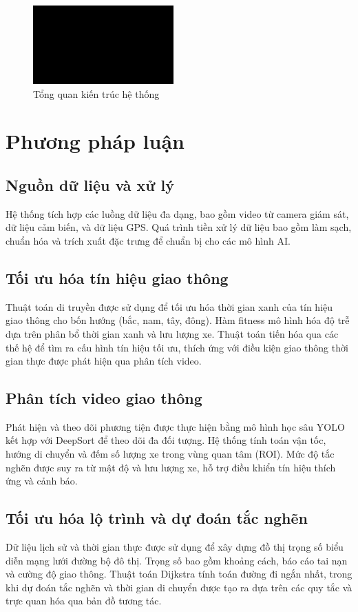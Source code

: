 \documentclass[conference]{IEEEtran}
\begin{document}
\begin{figure}[H]
    \centering
    \includegraphics[width=0.48\textwidth]{imgs/images.png}
    \caption{Tổng quan kiến trúc hệ thống}
    \label{fig:architecture_vn}
\end{figure}

\section{Phương pháp luận}
\subsection{Nguồn dữ liệu và xử lý}
Hệ thống tích hợp các luồng dữ liệu đa dạng, bao gồm video từ camera giám sát, dữ liệu cảm biến, và dữ liệu GPS. Quá trình tiền xử lý dữ liệu bao gồm làm sạch, chuẩn hóa và trích xuất đặc trưng để chuẩn bị cho các mô hình AI.

\subsection{Tối ưu hóa tín hiệu giao thông}
Thuật toán di truyền được sử dụng để tối ưu hóa thời gian xanh của tín hiệu giao thông cho bốn hướng (bắc, nam, tây, đông). Hàm fitness mô hình hóa độ trễ dựa trên phân bổ thời gian xanh và lưu lượng xe. Thuật toán tiến hóa qua các thế hệ để tìm ra cấu hình tín hiệu tối ưu, thích ứng với điều kiện giao thông thời gian thực được phát hiện qua phân tích video.

\subsection{Phân tích video giao thông}
Phát hiện và theo dõi phương tiện được thực hiện bằng mô hình học sâu YOLO kết hợp với DeepSort để theo dõi đa đối tượng. Hệ thống tính toán vận tốc, hướng di chuyển và đếm số lượng xe trong vùng quan tâm (ROI). Mức độ tắc nghẽn được suy ra từ mật độ và lưu lượng xe, hỗ trợ điều khiển tín hiệu thích ứng và cảnh báo.

\subsection{Tối ưu hóa lộ trình và dự đoán tắc nghẽn}
Dữ liệu lịch sử và thời gian thực được sử dụng để xây dựng đồ thị trọng số biểu diễn mạng lưới đường bộ đô thị. Trọng số bao gồm khoảng cách, báo cáo tai nạn và cường độ giao thông. Thuật toán Dijkstra tính toán đường đi ngắn nhất, trong khi dự đoán tắc nghẽn và thời gian di chuyển được tạo ra dựa trên các quy tắc và trực quan hóa qua bản đồ tương tác.
\end{document}
